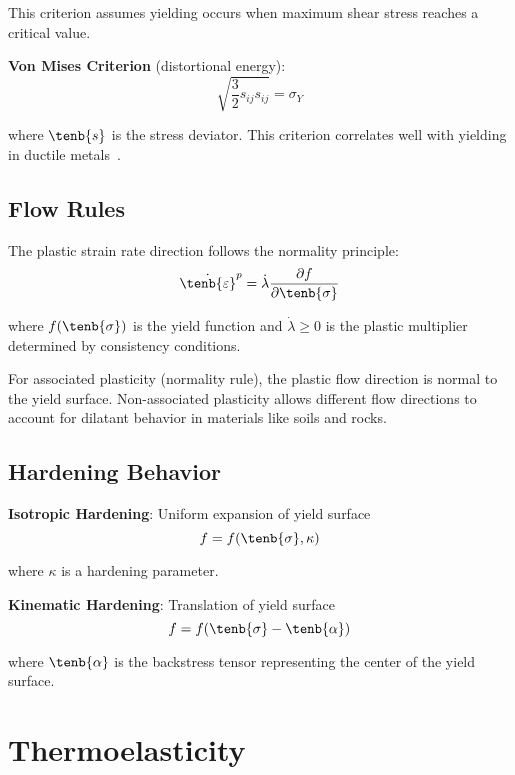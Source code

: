 This criterion assumes yielding occurs when maximum shear stress reaches a critical value.

\textbf{Von Mises Criterion} (distortional energy):
\begin{equation}
\sqrt{\frac{3}{2}s_{ij}s_{ij}} = \sigma_Y
\end{equation}

where $\tenb{s}$ is the stress deviator. This criterion correlates well with yielding in ductile metals~\autocite{Sadd.2019}.

\subsection{Flow Rules}

The plastic strain rate direction follows the normality principle:
\begin{equation}
\dot{\tenb{\varepsilon}}^p = \dot{\lambda} \frac{\partial f}{\partial \tenb{\sigma}}
\end{equation}

where $f(\tenb{\sigma})$ is the yield function and $\dot{\lambda} \geq 0$ is the plastic multiplier determined by consistency conditions.

For associated plasticity (normality rule), the plastic flow direction is normal to the yield surface. Non-associated plasticity allows different flow directions to account for dilatant behavior in materials like soils and rocks.

\subsection{Hardening Behavior}

\textbf{Isotropic Hardening}: Uniform expansion of yield surface
\begin{equation}
f = f(\tenb{\sigma}, \kappa)
\end{equation}

where $\kappa$ is a hardening parameter.

\textbf{Kinematic Hardening}: Translation of yield surface
\begin{equation}
f = f(\tenb{\sigma} - \tenb{\alpha})
\end{equation}

where $\tenb{\alpha}$ is the backstress tensor representing the center of the yield surface.

\section{Thermoelasticity}

